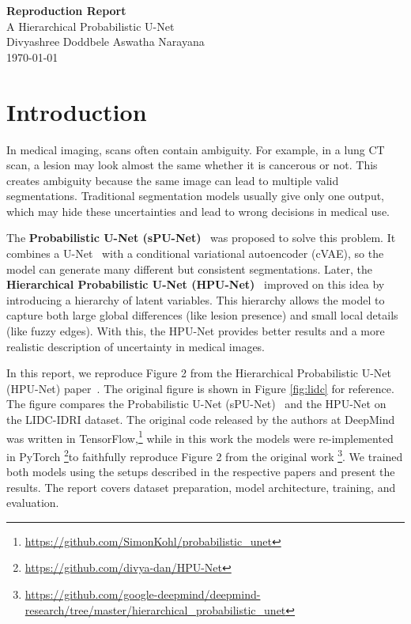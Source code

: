 \documentclass{article}
\begin{document}
\begin{titlepage}
    \centering
    \vspace*{\fill} %

    {\Huge \textbf{Reproduction Report}} \\[3ex]  %
    {\huge A Hierarchical Probabilistic U-Net} \\[10ex] %

    {\Large Divyashree Doddbele Aswatha Narayana} \\[2ex]

    {\large \today}

    \vspace*{\fill}
    \thispagestyle{empty} %
\end{titlepage}

\setcounter{page}{1}

\section{Introduction}
In medical imaging, scans often contain ambiguity. For example, in a lung CT scan, a lesion may look almost the same whether it is cancerous or not. This creates ambiguity because the same image can lead to multiple valid segmentations. Traditional segmentation models usually give only one output, which may hide these uncertainties and lead to wrong decisions in medical use.

The \textbf{Probabilistic U-Net (sPU-Net)}~\cite{Kohl2018} was proposed to solve this problem. It combines a U-Net~\cite{Ronneberger2015} with a conditional variational autoencoder (cVAE), so the model can generate many different but consistent segmentations. Later, the \textbf{Hierarchical Probabilistic U-Net (HPU-Net)}~\cite{Kohl2019} improved on this idea by introducing a hierarchy of latent variables. This hierarchy allows the model to capture both large global differences (like lesion presence) and small local details (like fuzzy edges). With this, the HPU-Net provides better results and a more realistic description of uncertainty in medical images.

In this report, we reproduce Figure 2 from the Hierarchical Probabilistic U-Net (HPU-Net) paper~\cite{Kohl2019}. The original figure is shown in Figure \ref{fig:lidc} for reference. The figure compares the Probabilistic U-Net (sPU-Net)~\cite{Kohl2018} and the HPU-Net on the LIDC-IDRI dataset. The original code released by the authors at DeepMind was written in TensorFlow,\footnote{\url{https://github.com/SimonKohl/probabilistic_unet}} while in this work the models were re-implemented in PyTorch \footnote{\url{https://github.com/divya-dan/HPU-Net}}to faithfully reproduce Figure 2 from the original work \footnote{\url{https://github.com/google-deepmind/deepmind-research/tree/master/hierarchical_probabilistic_unet}}. We trained both models using the setups described in the respective papers and present the results. The report covers dataset preparation, model architecture, training, and evaluation.
\end{document}
